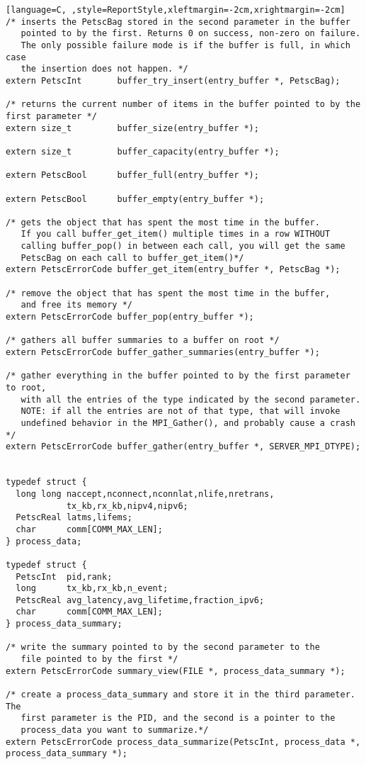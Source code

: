 \documentclass[11pt]{article}
\begin{document}
\begin{lstlisting}[language=C, ,style=ReportStyle,xleftmargin=-2cm,xrightmargin=-2cm]
/* inserts the PetscBag stored in the second parameter in the buffer 
   pointed to by the first. Returns 0 on success, non-zero on failure.
   The only possible failure mode is if the buffer is full, in which case
   the insertion does not happen. */
extern PetscInt       buffer_try_insert(entry_buffer *, PetscBag);

/* returns the current number of items in the buffer pointed to by the first parameter */
extern size_t         buffer_size(entry_buffer *);

extern size_t         buffer_capacity(entry_buffer *);

extern PetscBool      buffer_full(entry_buffer *);

extern PetscBool      buffer_empty(entry_buffer *);

/* gets the object that has spent the most time in the buffer.
   If you call buffer_get_item() multiple times in a row WITHOUT
   calling buffer_pop() in between each call, you will get the same
   PetscBag on each call to buffer_get_item()*/
extern PetscErrorCode buffer_get_item(entry_buffer *, PetscBag *);

/* remove the object that has spent the most time in the buffer,
   and free its memory */
extern PetscErrorCode buffer_pop(entry_buffer *);

/* gathers all buffer summaries to a buffer on root */
extern PetscErrorCode buffer_gather_summaries(entry_buffer *);

/* gather everything in the buffer pointed to by the first parameter to root,
   with all the entries of the type indicated by the second parameter.
   NOTE: if all the entries are not of that type, that will invoke 
   undefined behavior in the MPI_Gather(), and probably cause a crash */
extern PetscErrorCode buffer_gather(entry_buffer *, SERVER_MPI_DTYPE);


typedef struct {
  long long naccept,nconnect,nconnlat,nlife,nretrans,
            tx_kb,rx_kb,nipv4,nipv6;
  PetscReal latms,lifems;
  char      comm[COMM_MAX_LEN];
} process_data;

typedef struct {
  PetscInt  pid,rank;
  long      tx_kb,rx_kb,n_event;
  PetscReal avg_latency,avg_lifetime,fraction_ipv6;
  char      comm[COMM_MAX_LEN];
} process_data_summary;

/* write the summary pointed to by the second parameter to the
   file pointed to by the first */
extern PetscErrorCode summary_view(FILE *, process_data_summary *);

/* create a process_data_summary and store it in the third parameter. The
   first parameter is the PID, and the second is a pointer to the 
   process_data you want to summarize.*/
extern PetscErrorCode process_data_summarize(PetscInt, process_data *, process_data_summary *);


\end{lstlisting}
\end{document}
